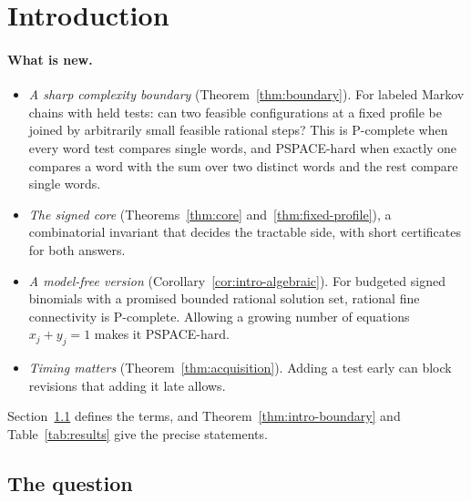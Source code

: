 
\section{Introduction}\label{sec:intro}

\paragraph{What is new.}
\begin{itemize}
\item \emph{A sharp complexity boundary} (Theorem~\ref{thm:boundary}).
For labeled Markov chains with held tests: can two feasible configurations
at a fixed profile be joined by arbitrarily small feasible rational steps?
This is P-complete when every word test compares single words, and
PSPACE-hard when exactly one compares a word with the sum over two distinct
words and the rest compare single words.
\item \emph{The signed core} (Theorems~\ref{thm:core}
and~\ref{thm:fixed-profile}), a combinatorial invariant that decides the
tractable side, with short certificates for both answers.
\item \emph{A model-free version} (Corollary~\ref{cor:intro-algebraic}).
For budgeted signed binomials with a promised bounded rational solution
set, rational fine connectivity is P-complete. Allowing a growing number
of equations $x_j+y_j=1$ makes it PSPACE-hard.
\item \emph{Timing matters} (Theorem~\ref{thm:acquisition}). Adding a test
early can block revisions that adding it late allows.
\end{itemize}
Section~\ref{sec:question} defines the terms, and
Theorem~\ref{thm:intro-boundary} and Table~\ref{tab:results} give the
precise statements.


\subsection{The question}\label{sec:question}


